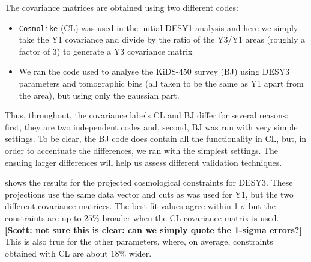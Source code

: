 \documentclass[twocolumn]{\docclass}
\newcommand\scott[1]{{\bf [Scott: #1]}}
\begin{document}
	The covariance matrices are obtained using two different codes: 
	\begin{itemize}
	\item {\tt Cosmolike} \citep{Krause:2016jvl} (CL) was used in the initial DESY1 analysis and here we simply take the Y1 covariance and divide by the ratio of the Y3/Y1 areas (roughly a factor of 3) to generate a Y3 covariance matrix
	\item We ran the code used to analyse the KiDS-450 survey \citep{Kohlinger:2017sxk} (BJ) using DESY3 parameters and tomographic bins (all taken to be the same as Y1 apart from the area), but using only the gaussian part. 
	\end{itemize}
	Thus, throughout, the covariance labels CL and BJ differ for several reasons: first, they are two independent codes and, second, BJ was run with very simple settings. To be clear, the BJ code does contain all the functionality in CL, but, in order to accentuate the differences, we ran with the simplest settings. The ensuing larger differences will help us assess different validation techniques.
	
 shows the results for the projected cosmological constraints for DESY3. These projections use the same data vector and cuts as was used for Y1, but the two different covariance matrices. The best-fit values agree within 1-$\sigma$ but the constraints are up to $25\%$ broader when the CL covariance matrix is used. \scott{not sure this is clear: can we simply quote the 1-sigma errors?}
This is also true for the other parameters, where, on average, constraints obtained with CL are about $18\%$ wider.	
		
\end{document}
